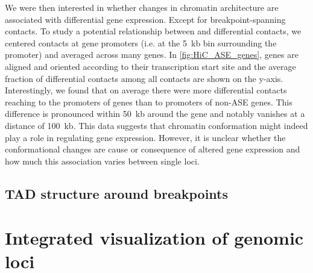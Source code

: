 
We were then interested in whether changes in chromatin architecture are
associated with differential gene expression. Except for breakpoint-spanning
contacts. To study a potential relationship between \ase and differential
contacts, we centered \hic contacts at gene promoters (i.e. at the 5~kb bin
surrounding the promoter) and averaged across many genes. In
\cref{fig:HiC_ASE_genes}, genes are aligned and oriented according to their
transcription start site and the average fraction of differential contacts among
all contacts are shown on the y-axis. Interestingly, we found that on average
there were more differential \hic contacts reaching to the promoters of
\ase genes than to promoters of non-ASE genes. This difference is pronounced
within 50~kb around the gene and notably vanishes at a distance of 100~kb.
This data suggests that chromatin conformation might indeed play a role in
regulating gene expression. However, it is unclear whether the conformational
changes are cause or consequence of altered gene expression and how much this
association varies between single loci.





\subsection{TAD structure around breakpoints}
\label{sec:balancer_tads_at_bp}








\section{Integrated visualization of genomic loci}
\label{sec:balancer_visualization}

